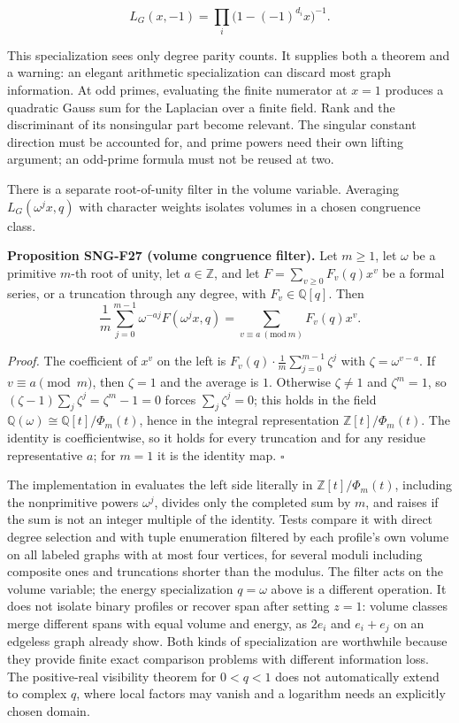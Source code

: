 \documentclass[
  11pt,
  a4paper,
]{report}
\let\singularitytexttt\texttt
\renewcommand{\texttt}[1]{\singularitytexttt{\seqsplit{#1}}}
\begin{document}
\[
L_G(x,-1)=\prod_i\bigl(1-(-1)^{d_i}x\bigr)^{-1}.
\]

This specialization sees only degree parity counts. It supplies both a
theorem and a warning: an elegant arithmetic specialization can discard
most graph information. At odd primes, evaluating the finite numerator
at \(x=1\) produces a quadratic Gauss sum for the Laplacian over a
finite field. Rank and the discriminant of its nonsingular part become
relevant. The singular constant direction must be accounted for, and
prime powers need their own lifting argument; an odd-prime formula must
not be reused at two.

There is a separate root-of-unity filter in the volume variable.
Averaging \(L_G(\omega^j x,q)\) with character weights isolates volumes
in a chosen congruence class.

\textbf{Proposition SNG-F27 (volume congruence filter).} Let \(m\ge1\),
let \(\omega\) be a primitive \(m\)-th root of unity, let
\(a\in\mathbb Z\), and let \(F=\sum_{v\ge0}F_v(q)x^v\) be a formal
series, or a truncation through any degree, with \(F_v\in\mathbb Q[q]\).
Then \[
\frac1m\sum_{j=0}^{m-1}\omega^{-aj}F(\omega^jx,q)=\sum_{v\equiv a\ (\mathrm{mod}\ m)}F_v(q)x^v .
\]

\emph{Proof.} The coefficient of \(x^v\) on the left is
\(F_v(q)\cdot\frac1m\sum_{j=0}^{m-1}\zeta^{j}\) with
\(\zeta=\omega^{v-a}\). If \(v\equiv a\pmod m\), then \(\zeta=1\) and
the average is \(1\). Otherwise \(\zeta\ne1\) and \(\zeta^m=1\), so
\((\zeta-1)\sum_j\zeta^j=\zeta^m-1=0\) forces \(\sum_j\zeta^j=0\); this
holds in the field \(\mathbb Q(\omega)\cong\mathbb Q[t]/\Phi_m(t)\),
hence in the integral representation \(\mathbb Z[t]/\Phi_m(t)\). The
identity is coefficientwise, so it holds for every truncation and for
any residue representative \(a\); for \(m=1\) it is the identity map.
\(\square\)

The implementation in \texttt{src/singularity/congruence.py} evaluates
the left side literally in \(\mathbb Z[t]/\Phi_m(t)\), including the
nonprimitive powers \(\omega^j\), divides only the completed sum by
\(m\), and raises if the sum is not an integer multiple of the identity.
Tests compare it with direct degree selection and with tuple enumeration
filtered by each profile's own volume on all labeled graphs with at most
four vertices, for several moduli including composite ones and
truncations shorter than the modulus. The filter acts on the volume
variable; the energy specialization \(q=\omega\) above is a different
operation. It does not isolate binary profiles or recover span after
setting \(z=1\): volume classes merge different spans with equal volume
and energy, as \(2e_i\) and \(e_i+e_j\) on an edgeless graph already
show. Both kinds of specialization are worthwhile because they provide
finite exact comparison problems with different information loss. The
positive-real visibility theorem for \(0<q<1\) does not automatically
extend to complex \(q\), where local factors may vanish and a logarithm
needs an explicitly chosen domain.
\end{document}
